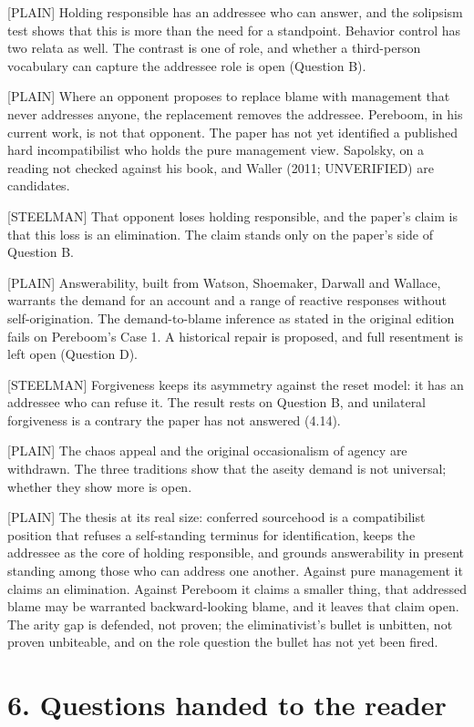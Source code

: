 \documentclass[11pt]{article}
\newcommand{\register}[1]{{\ttfamily\small #1}}
\begin{document}
\register{[PLAIN]} Holding responsible has an addressee who can answer, and the solipsism test shows that this is more than the need for a standpoint. Behavior control has two relata as well. The contrast is one of role, and whether a third-person vocabulary can capture the addressee role is open (Question B).

\register{[PLAIN]} Where an opponent proposes to replace blame with management that never addresses anyone, the replacement removes the addressee. Pereboom, in his current work, is not that opponent. The paper has not yet identified a published hard incompatibilist who holds the pure management view. Sapolsky, on a reading not checked against his book, and Waller (2011; UNVERIFIED) are candidates.

\register{[STEELMAN]} That opponent loses holding responsible, and the paper's claim is that this loss is an elimination. The claim stands only on the paper's side of Question B.

\register{[PLAIN]} Answerability, built from Watson, Shoemaker, Darwall and Wallace, warrants the demand for an account and a range of reactive responses without self-origination. The demand-to-blame inference as stated in the original edition fails on Pereboom's Case 1. A historical repair is proposed, and full resentment is left open (Question D).

\register{[STEELMAN]} Forgiveness keeps its asymmetry against the reset model: it has an addressee who can refuse it. The result rests on Question B, and unilateral forgiveness is a contrary the paper has not answered (4.14).

\register{[PLAIN]} The chaos appeal and the original occasionalism of agency are withdrawn. The three traditions show that the aseity demand is not universal; whether they show more is open.

\register{[PLAIN]} The thesis at its real size: conferred sourcehood is a compatibilist position that refuses a self-standing terminus for identification, keeps the addressee as the core of holding responsible, and grounds answerability in present standing among those who can address one another. Against pure management it claims an elimination. Against Pereboom it claims a smaller thing, that addressed blame may be warranted backward-looking blame, and it leaves that claim open. The arity gap is defended, not proven; the eliminativist's bullet is unbitten, not proven unbiteable, and on the role question the bullet has not yet been fired.

\section*{6. Questions handed to the reader}
\end{document}
